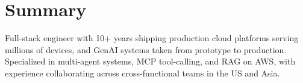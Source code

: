 \section{Summary}
Full-stack engineer with 10+ years shipping production cloud platforms serving millions of devices, and GenAI systems taken from prototype to production. Specialized in multi-agent systems, MCP tool-calling, and RAG on AWS, with experience collaborating across cross-functional teams in the US and Asia.

